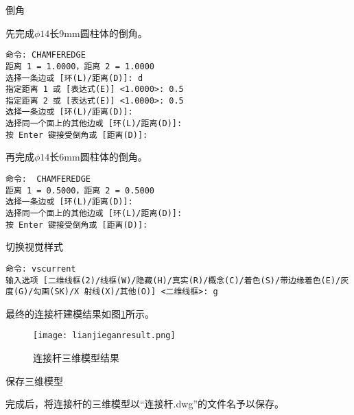 \begin{procedure}
\begin{figure}[htbp]
\centering
\begin{floatrow}[2]
\end{floatrow}
\end{figure}
\item 倒角

先完成$\phi 14$长9mm圆柱体的倒角。
\begin{lstlisting}
命令: CHAMFEREDGE
距离 1 = 1.0000，距离 2 = 1.0000
选择一条边或 [环(L)/距离(D)]: d
指定距离 1 或 [表达式(E)] <1.0000>: 0.5
指定距离 2 或 [表达式(E)] <1.0000>: 0.5
选择一条边或 [环(L)/距离(D)]:
选择同一个面上的其他边或 [环(L)/距离(D)]:
按 Enter 键接受倒角或 [距离(D)]:
\end{lstlisting}

再完成$\phi 14$长6mm圆柱体的倒角。
\begin{lstlisting}
命令:  CHAMFEREDGE
距离 1 = 0.5000，距离 2 = 0.5000
选择一条边或 [环(L)/距离(D)]:
选择同一个面上的其他边或 [环(L)/距离(D)]:
按 Enter 键接受倒角或 [距离(D)]:
\end{lstlisting}
\item 切换视觉样式
\begin{lstlisting}
命令: vscurrent
输入选项 [二维线框(2)/线框(W)/隐藏(H)/真实(R)/概念(C)/着色(S)/带边缘着色(E)/灰度(G)/勾画(SK)/X 射线(X)/其他(O)] <二维线框>: g
\end{lstlisting}

最终的连接杆建模结果如图\ref{fig:lianjieganresult}所示。
\begin{figure}[htbp]
\centering
\texttt{[image: lianjieganresult.png]}
\caption{连接杆三维模型结果}\label{fig:lianjieganresult}
\end{figure}

\item 保存三维模型

完成后，将连接杆的三维模型以“连接杆.dwg”的文件名予以保存。
\end{procedure}
\endinput